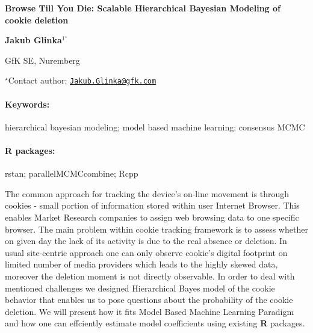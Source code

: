 \documentclass[11pt, a4paper]{article}
\renewcommand{\title}[1]{\begin{center}{\bf \LARGE #1}\end{center}}
\newcommand{\keywords}{\paragraph{Keywords:}}
\newcommand{\packages}{\paragraph{R packages:}}
\begin{document}
\pagestyle{empty}

\title{Browse Till You Die: Scalable Hierarchical Bayesian Modeling of cookie
deletion}

\begin{center}
  {\bf Jakub Glinka$^{1^\star}$}
\end{center}

\vskip 0.3cm

\begin{affiliations}
\begin{enumerate}
\begin{minipage}{0.915\textwidth}
\centering
\item GfK SE, Nuremberg \\[-2pt]
\end{minipage}
\end{enumerate}
$^\star$Contact author: \href{mailto:Jakub.Glinka@gfk.com}{\nolinkurl{Jakub.Glinka@gfk.com}}\\
\end{affiliations}

\vskip 0.5cm

\begin{minipage}{0.915\textwidth}
\keywords hierarchical bayesian modeling; model based machine learning; consensus
MCMC
\packages rstan; parallelMCMCcombine; Rcpp
\end{minipage}

\vskip 0.8cm

The common approach for tracking the device's on-line movement is
through cookies - small portion of information stored within user
Internet Browser. This enables Market Research companies to assign web
browsing data to one specific browser. The main problem within cookie
tracking framework is to assess whether on given day the lack of its
activity is due to the real absence or deletion. In usual site-centric
approach one can only observe cookie's digital footprint on limited
number of media providers which leads to the highly skewed data,
moreover the deletion moment is not directly observable. In order to
deal with mentioned challenges we designed Hierarchical Bayes model of
the cookie behavior that enables us to pose questions about the
probability of the cookie deletion. We will present how it fits Model
Based Machine Learning Paradigm and how one can effciently estimate
model coefficients using existing \textbf{R} packages.
\end{document}
